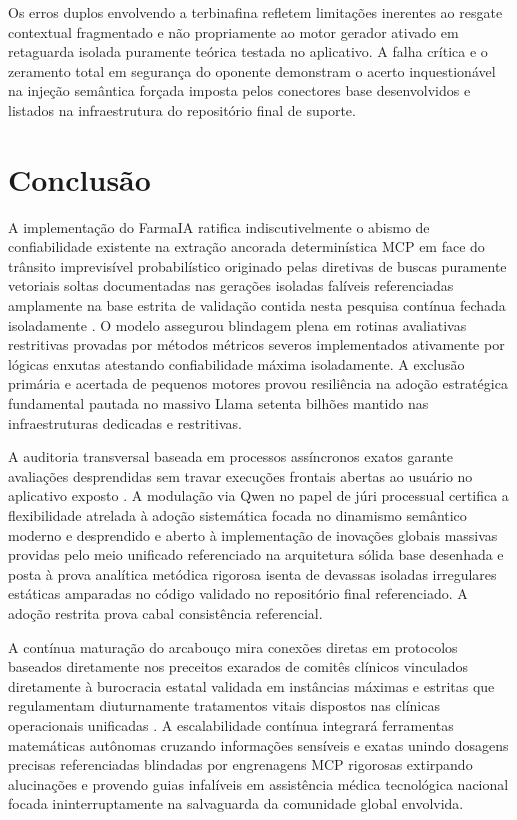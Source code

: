 \documentclass[12pt]{article}
\begin{document}
Os erros duplos envolvendo a terbinafina refletem limitações inerentes ao resgate contextual fragmentado e não propriamente ao motor gerador ativado em retaguarda isolada puramente teórica testada no aplicativo. A falha crítica e o zeramento total em segurança do oponente demonstram o acerto inquestionável na injeção semântica forçada imposta pelos conectores base desenvolvidos e listados na infraestrutura do repositório final de suporte.

\section{Conclusão}
\label{sec:conclusao}

A implementação do FarmaIA ratifica indiscutivelmente o abismo de confiabilidade existente na extração ancorada determinística MCP em face do trânsito imprevisível probabilístico originado pelas diretivas de buscas puramente vetoriais soltas documentadas nas gerações isoladas falíveis referenciadas amplamente na base estrita de validação contida nesta pesquisa contínua fechada isoladamente \cite{hou2025mcp}. O modelo assegurou blindagem plena em rotinas avaliativas restritivas provadas por métodos métricos severos implementados ativamente por lógicas enxutas atestando confiabilidade máxima isoladamente. A exclusão primária e acertada de pequenos motores provou resiliência na adoção estratégica fundamental pautada no massivo Llama setenta bilhões mantido nas infraestruturas dedicadas e restritivas.

A auditoria transversal baseada em processos assíncronos exatos garante avaliações desprendidas sem travar execuções frontais abertas ao usuário no aplicativo exposto \cite{zheng2023judging}. A modulação via Qwen no papel de júri processual certifica a flexibilidade atrelada à adoção sistemática focada no dinamismo semântico moderno e desprendido e aberto à implementação de inovações globais massivas providas pelo meio unificado referenciado na arquitetura sólida base desenhada e posta à prova analítica metódica rigorosa isenta de devassas isoladas irregulares estáticas amparadas no código validado no repositório final referenciado. A adoção restrita prova cabal consistência referencial.

A contínua maturação do arcabouço mira conexões diretas em protocolos baseados diretamente nos preceitos exarados de comitês clínicos vinculados diretamente à burocracia estatal validada em instâncias máximas e estritas que regulamentam diuturnamente tratamentos vitais dispostos nas clínicas operacionais unificadas \cite{karpathy2023llmos}. A escalabilidade contínua integrará ferramentas matemáticas autônomas cruzando informações sensíveis e exatas unindo dosagens precisas referenciadas blindadas por engrenagens MCP rigorosas extirpando alucinações e provendo guias infalíveis em assistência médica tecnológica nacional focada ininterruptamente na salvaguarda da comunidade global envolvida.
\end{document}
